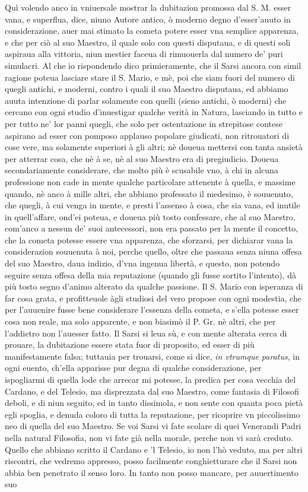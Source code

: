 \documentclass[11pt,twoside,openany]{book}
\begin{document}
Quì volendo anco in vniuersale mostrar la dubitazion promossa dal S. M. esser vana, e superflua, dice, niuno Autore antico, ò moderno degno d'esser'auuto in considerazione, auer mai stimato la cometa potere esser vna semplice apparenza, e che per ciò al suo Maestro, il quale solo con questi disputaua, e di questi soli aspiraua alla vittoria, niun mestier faceua di rimuouerla dal numero de' puri simulacri. Al che io rispondendo dico primieramente, che il Sarsi ancora con simil ragione poteua lasciare stare il S. Mario, e mè, poi che siam fuori del numero di quegli antichi, e moderni, contro i quali il suo Maestro disputaua, ed abbiamo auuta intenzione di parlar solamente con quelli (sieno antichi, ò moderni) che cercano con ogni studio d'inuestigar qualche verità in Natura, lasciando in tutto e per tutto ne' lor panni quegli, che solo per ostentazione in strepitose contese aspirano ad esser con pomposo applauso popolare giudicati, non ritrouatori di cose vere, ma solamente superiori à gli altri; nè doueua mettersi con tanta ansietà per atterrar cosa, che nè à se, nè al suo Maestro era di pregiudicio. Doueua secondariamente considerare, che molto più è scusabile vno, à chi in alcuna professione non cade in mente qualche particolare attenente à quella, e massime quando, nè anco à mille altri, che abbiano professato il medesimo, è souuenuto, che quegli, à cui venga in mente, e presti l'assenso à cosa, che sia vana, ed inutile in quell'affare, ond'ei poteua, e doueua più tosto confessare, che al suo Maestro, com'anco a nessun de' suoi antecessori, non era passato per la mente il concetto, che la cometa potesse essere vna apparenza, che sforzarsi, per dichiarar vana la considerazion souuenuta à noi, perche quello, oltre che passaua senza niuna offesa del suo Maestro, daua indizio, d'vna ingenua libertà, e questo, non potendo seguire senza offesa della mia reputazione (quando gli fusse sortito l'intento), dà più tosto segno d'animo alterato da qualche passione. Il S. Mario con isperanza di far cosa grata, e profitteuole àgli studiosi del vero propose con ogni modestia, che per l'auuenire fusse bene considerare l'essenza della cometa, e s'ella potesse esser cosa non reale, ma solo apparente, e non biasimò il P. Gr. nè altri, che per l'addietro non l'auesser fatto. Il Sarsi si leua sù, e con mente alterata cerca di prouare, la dubitazione essere stata fuor di proposito, ed esser di più manifestamente falsa; tuttauia per trouarsi, come si dice, \textit{in vtrumque paratus}, in ogni euento, ch'ella apparisse pur degna di qualche considerazione, per ispogliarmi di quella lode che arrecar mi potesse, la predica per cosa vecchia del Cardano, e del Telesio, ma disprezzata dal suo Maestro, come fantasia di Filosofi deboli, e di niun seguito, ed in tanto dissimola, e non sente con quanta poca pietà egli spoglia, e denuda coloro di tutta la reputazione, per ricoprire vn piccolissimo neo di quella del suo Maestro. Se voi Sarsi vi fate scolare di quei Venerandi Padri nella natural Filosofia, non vi fate già nella morale, perche non vi sarà creduto. Quello che abbiano scritto il Cardano e 'l Telesio, io non l'hò veduto, ma per altri riscontri, che vedremo appresso, posso facilmente conghietturare che il Sarsi non abbia ben penetrato il senso loro. In tanto non posso mancare, per auuertimento suo 
\end{document}
